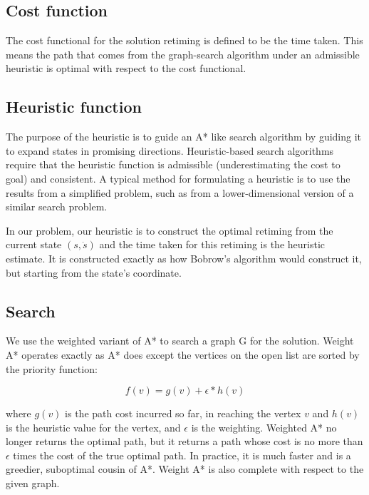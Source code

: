\documentclass[letterpaper,12pt]{article} %
\begin{document}
\subsection{Cost function}\label{subsec:cost}

The cost functional for the solution retiming is defined to be the time taken. This means the path that comes from the graph-search algorithm under an admissible heuristic is optimal with respect to the cost functional.

\subsection{Heuristic function}\label{subsec:heur}

The purpose of the heuristic is to guide an A* like search algorithm by guiding it to expand states in promising directions. Heuristic-based search algorithms require that the heuristic function is admissible (underestimating the cost to goal) and consistent. A typical method for formulating a heuristic is to use the results from a simplified problem, such as from a lower-dimensional version of a similar search problem.

In our problem, our heuristic is to construct the optimal retiming from the current state $(s, \dot{s})$ and the time taken for this retiming is the heuristic estimate. It is constructed exactly as how Bobrow's algorithm would construct it, but starting from the state's coordinate.

\subsection{Search}\label{subsec:search}

We use the weighted variant of A* to search a graph G for the solution. Weight A* operates exactly as A* does except the vertices on the open list are sorted by the priority function:

\begin{equation}
f( v ) = g( v ) + \epsilon * h( v )
\end{equation}

where $g(v)$ is the path cost incurred so far, in reaching the vertex $v$ and $h(v)$ is the heuristic value for the vertex, and $\epsilon$ is the weighting. Weighted A* no longer returns the optimal path, but it returns a path whose cost is no more than $\epsilon$ times the cost of the true optimal path. In practice, it is much faster and is a greedier, suboptimal cousin of A*. Weight A* is also complete with respect to the given graph.
\end{document}
